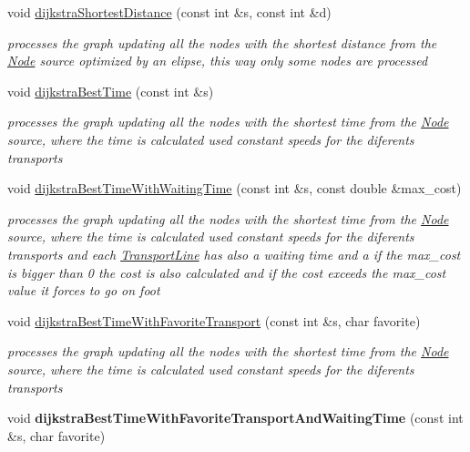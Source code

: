 \begin{DoxyCompactItemize}
void \hyperlink{class_graph_aa7ed404a514a3c1bbbd7b9404b715b85}{dijkstra\+Shortest\+Distance} (const int \&s, const int \&d)
\begin{DoxyCompactList}\small\item\em processes the graph updating all the nodes with the shortest distance from the \hyperlink{class_node}{Node} source optimized by an elipse, this way only some nodes are processed \end{DoxyCompactList}\item 
void \hyperlink{class_graph_a19c3559dc86f0dd1da72a157f864f449}{dijkstra\+Best\+Time} (const int \&s)
\begin{DoxyCompactList}\small\item\em processes the graph updating all the nodes with the shortest time from the \hyperlink{class_node}{Node} source, where the time is calculated used constant speeds for the diferents transports \end{DoxyCompactList}\item 
void \hyperlink{class_graph_ae1ed9f85f6201ed1b4f095cf4533eb9c}{dijkstra\+Best\+Time\+With\+Waiting\+Time} (const int \&s, const double \&max\+\_\+cost)
\begin{DoxyCompactList}\small\item\em processes the graph updating all the nodes with the shortest time from the \hyperlink{class_node}{Node} source, where the time is calculated used constant speeds for the diferents transports and each \hyperlink{class_transport_line}{Transport\+Line} has also a waiting time and a if the max\+\_\+cost is bigger than 0 the cost is also calculated and if the cost exceeds the max\+\_\+cost value it forces to go on foot \end{DoxyCompactList}\item 
void \hyperlink{class_graph_a7bc7e3e61b1a753e8e043cf3e713cdc4}{dijkstra\+Best\+Time\+With\+Favorite\+Transport} (const int \&s, char favorite)
\begin{DoxyCompactList}\small\item\em processes the graph updating all the nodes with the shortest time from the \hyperlink{class_node}{Node} source, where the time is calculated used constant speeds for the diferents transports \end{DoxyCompactList}\item 
\mbox{\label{class_graph_a49569935f28e3b752fce50791261024a}} 
void {\bfseries dijkstra\+Best\+Time\+With\+Favorite\+Transport\+And\+Waiting\+Time} (const int \&s, char favorite)

\end{DoxyCompactItemize}
